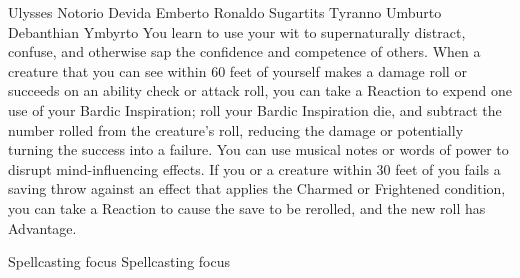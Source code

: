 \begin{monsterbox}{Ulysses Notorio Devida Emberto Ronaldo Sugartits Tyranno Umburto Debanthian Ymbyrto}
     You learn to use your wit to supernaturally distract, confuse, and otherwise sap the confidence and competence of others. When a creature that you can see within 60 feet of yourself makes a damage roll or succeeds on an ability check or attack roll, you can take a Reaction to expend one use of your Bardic Inspiration; roll your Bardic Inspiration die, and subtract the number rolled from the creature's roll, reducing the damage or potentially turning the success into a failure.
     You can use musical notes or words of power to disrupt mind-influencing effects. If you or a creature within 30 feet of you fails a saving throw against an effect that applies the Charmed or Frightened condition, you can take a Reaction to cause the save to be rerolled, and the new roll has Advantage.

     Spellcasting focus
     Spellcasting focus

\end{monsterbox}
